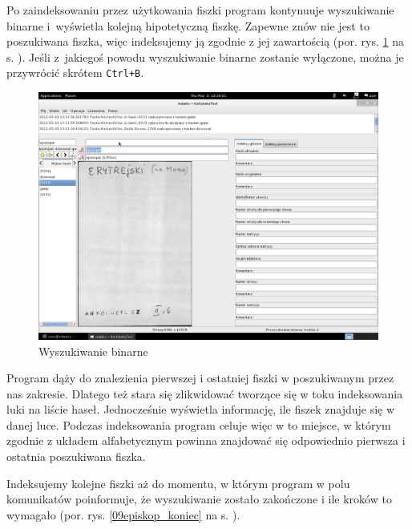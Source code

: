 \documentclass[12pt,oneside,notitlepage,titleauthor]{mwart}%
\begin{document}
Po zaindeksowaniu przez użytkowania fiszki program kontynuuje wyszukiwanie binarne i~wyświetla kolejną hipotetyczną fiszkę. Zapewne znów nie jest to poszukiwana fiszka, więc indeksujemy ją zgodnie z jej zawartością (por. rys. \ref{binarne} na s. \pageref{binarne}). Jeśli z~jakiegoś powodu wyszukiwanie binarne zostanie wyłączone, można je przywrócić skrótem \texttt{Ctrl+B}.

\begin{figure}[h]
\includegraphics[scale=0.3]{04episkopat_dziura.png}
\caption{Wyszukiwanie binarne}
\label{binarne}
\end{figure}


Program dąży do znalezienia pierwszej i ostatniej fiszki w poszukiwanym przez nas zakresie. Dlatego też stara się zlikwidować tworzące się w toku indeksowania luki na liście haseł. Jednocześnie wyświetla informację, ile fiszek znajduje się w danej luce. Podczas indeksowania program celuje więc w to miejsce, w którym zgodnie z układem alfabetycznym powinna znajdować się odpowiednio pierwsza i ostatnia poszukiwana fiszka.  


Indeksujemy kolejne fiszki aż do momentu, w którym program w polu komunikatów poinformuje, że wyszukiwanie zostało zakończone i ile kroków to wymagało (por. rys. \ref{09episkop_koniec} na s. \pageref{09episkop_koniec}).
\end{document}
